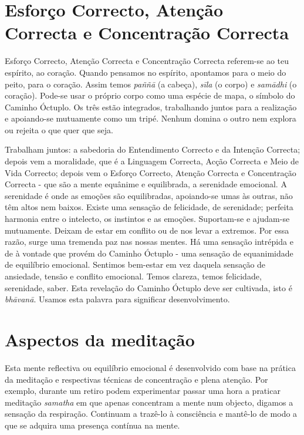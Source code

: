 \section{Esforço Correcto, Atenção Correcta e Concentração Correcta}

Esforço Correcto, Atenção Correcta e Concentração Correcta referem-se ao teu
espírito, ao coração. Quando pensamos no espírito, apontamos para o meio do
peito, para o coração. Assim temos \emph{paññā} (a cabeça), \emph{sīla} (o
corpo) e \emph{samādhi} (o coração). Pode-se usar o próprio corpo como uma
espécie de mapa, o símbolo do Caminho Óctuplo. Os três estão integrados,
trabalhando juntos para a realização e apoiando-se mutuamente como um tripé.
Nenhum domina o outro nem explora ou rejeita o que quer que seja.

Trabalham juntos: a sabedoria do Entendimento Correcto e da Intenção Correcta;
depois vem a moralidade, que é a Linguagem Correcta, Acção Correcta e Meio de
Vida Correcto; depois vem o Esforço Correcto, Atenção Correcta e Concentração
Correcta - que são a mente equânime e equilibrada, a serenidade emocional. A
serenidade é onde as emoções são equilibradas, apoiando-se umas às outras, não
têm altos nem baixos. Existe uma sensação de felicidade, de serenidade; perfeita
harmonia entre o intelecto, os instintos e as emoções. Suportam-se e ajudam-se
mutuamente. Deixam de estar em conflito ou de nos levar a extremos. Por essa
razão, surge uma tremenda paz nas nossas mentes. Há uma sensação intrépida e de
à vontade que provém do Caminho Óctuplo - uma sensação de equanimidade de
equilíbrio emocional. Sentimos bem-estar em vez daquela sensação de ansiedade,
tensão e conflito emocional. Temos clareza, temos felicidade, serenidade, saber.
Esta revelação do Caminho Óctuplo deve ser cultivada, isto é \emph{bhāvanā}.
Usamos esta palavra para significar desenvolvimento.

\section{Aspectos da meditação}

Esta mente reflectiva ou equilíbrio emocional é desenvolvido com base na prática
da meditação e respectivas técnicas de concentração e plena atenção. Por
exemplo, durante um retiro podem experimentar passar uma hora a praticar
meditação \emph{samatha} em que apenas concentram a mente num objecto, digamos a
sensação da respiração. Continuam a trazê-lo à consciência e mantê-lo de modo a
que se adquira uma presença contínua na mente.

